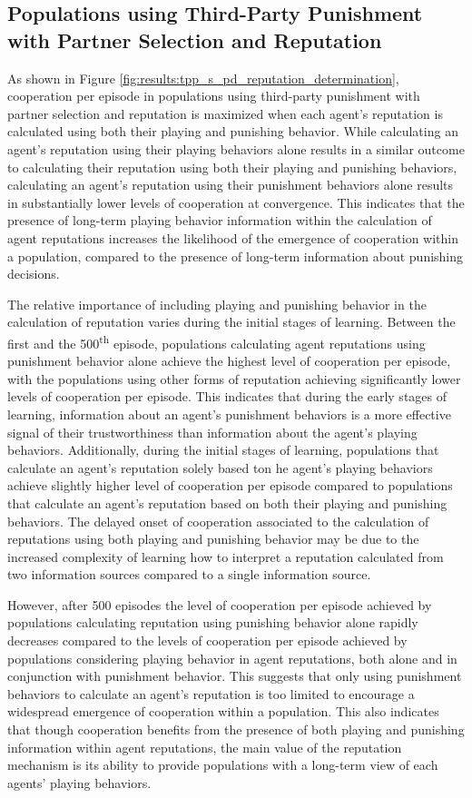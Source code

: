 \documentclass[sn-aps,numbered]{sn-jnl}%
\theoremstyle{thmstyleone}%
\theoremstyle{thmstyletwo}%
\theoremstyle{thmstylethree}%
\begin{document}
\begin{appendices}
\subsection{Populations using Third-Party Punishment with Partner Selection and Reputation}

As shown in Figure \ref{fig:results:tpp_s_pd_reputation_determination}, cooperation per episode in populations using third-party punishment with partner selection and reputation is maximized when each agent's reputation is calculated using both their playing and punishing behavior. While calculating an agent's reputation using their playing behaviors alone results in a similar outcome to calculating their reputation using both their playing and punishing behaviors, calculating an agent's reputation using their punishment behaviors alone results in substantially lower levels of cooperation at convergence. This indicates that the presence of long-term playing behavior information within the calculation of agent reputations increases the likelihood of the emergence of cooperation within a population, compared to the presence of long-term information about punishing decisions. 

The relative importance of including playing and punishing behavior in the calculation of reputation varies during the initial stages of learning. Between the first and the 500\textsuperscript{th} episode, populations calculating agent reputations using punishment behavior alone achieve the highest level of cooperation per episode, with the populations using other forms of reputation achieving significantly lower levels of cooperation per episode. This indicates that during the early stages of learning, information about an agent's punishment behaviors is a more effective signal of their trustworthiness than information about the agent's playing behaviors. Additionally, during the initial stages of learning, populations that calculate an agent's reputation solely based ton he agent's playing behaviors achieve slightly higher level of cooperation per episode compared to populations that calculate an agent's reputation based on both their playing and punishing behaviors. The delayed onset of cooperation associated to the calculation of reputations using both playing and punishing behavior may be due to the increased complexity of learning how to interpret a reputation calculated from two information sources compared to a single information source. 

However, after 500 episodes the level of cooperation per episode achieved by populations calculating reputation using punishing behavior alone rapidly decreases compared to the levels of cooperation per episode achieved by populations considering playing behavior in agent reputations, both alone and in conjunction with punishment behavior. This suggests that only using punishment behaviors to calculate an agent's reputation is too limited to encourage a widespread emergence of cooperation within a population. This also indicates that though cooperation benefits from the presence of both playing and punishing information within agent reputations, the main value of the reputation mechanism is its ability to provide populations with a long-term view of each agents' playing behaviors.


\end{appendices}
\end{document}
